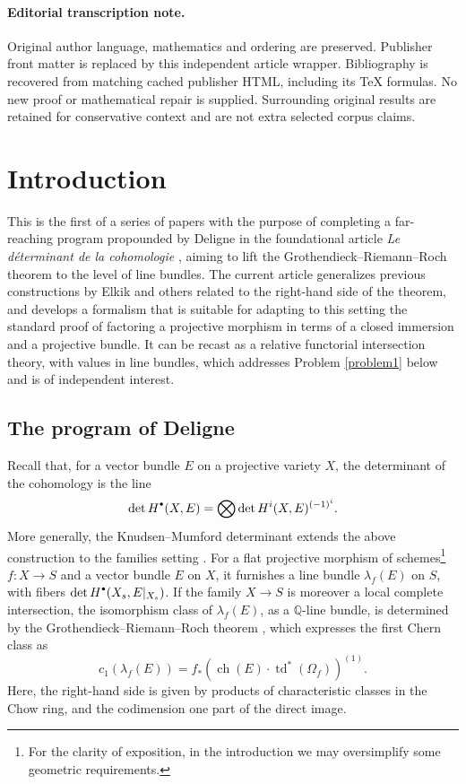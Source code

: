 \documentclass[11pt]{article}
\newcommand{\sbullet}{{\scriptscriptstyle\bullet}}
\newcommand{\csbullet}{{\raisebox{1pt}{$\sbullet$}}}
\theoremstyle{plain}
\theoremstyle{definition}
\newcommand{\QBbb}{\mathbb Q}
\DeclareMathOperator{\ch}{ch}
\DeclareMathOperator{\td}{td}
\begin{document}
\paragraph{Editorial transcription note.}
Original author language, mathematics and ordering are preserved. Publisher front matter is replaced by this independent article wrapper. Bibliography is recovered from matching cached publisher HTML, including its TeX formulas. No new proof or mathematical repair is supplied. Surrounding original results are retained for conservative context and are not extra selected corpus claims.
\clearpage

\section{Introduction}
This is the first of a series of papers with the purpose of completing a far-reaching program propounded by Deligne in the foundational article \emph{Le déterminant de la cohomologie} \cite{Deligne-determinant}, aiming to lift the Grothendieck--Riemann--Roch theorem to the level of line bundles. The current article generalizes previous constructions by Elkik \cite{Elkikfib} and others related to the right-hand side of the theorem, and develops a formalism that is suitable for adapting to this setting the standard proof of factoring a projective morphism in terms of a closed immersion and a projective bundle. It can be recast as a relative functorial intersection theory, with values in line bundles, which addresses Problem \ref{problem1} below and is of independent interest.

\subsection{The program of Deligne}
Recall that, for a vector bundle $E$ on a projective variety $X$, the determinant of the cohomology is the line
\begin{displaymath}
\det H^{\csbullet}(X,E) = \bigotimes \det H^i(X,E)^{(-1)^i}.
\end{displaymath}
More generally, the Knudsen--Mumford determinant extends the above construction to the families setting \cite{KnudsenMumford}. For a flat projective morphism of schemes\footnote{For the clarity of exposition, in the introduction we may oversimplify some geometric requirements.} $f\colon X\to S$ and a vector bundle $E$ on $X$, it furnishes a line bundle $\lambda_{f}(E)$ on $S$, with fibers $\det H^{\csbullet}(X_{s},E|_{X_{s}})$. If the family $X\to S$ is moreover a local complete intersection, the isomorphism class of $\lambda_{f}(E)$, as a $\QBbb$-line bundle, is determined by the Grothendieck--Riemann--Roch theorem \cite{SGA6}, which expresses the first Chern class as
\begin{equation}\label{eq:GRR}
c_1(\lambda_{f}(E)) = f_\ast \left(\ch(E) \cdot \td^{\ast}(\Omega_f) \right)^{(1)}.
\end{equation}
Here, the right-hand side is given by products of characteristic classes in the Chow ring, and the codimension one part of the direct image.
\end{document}
